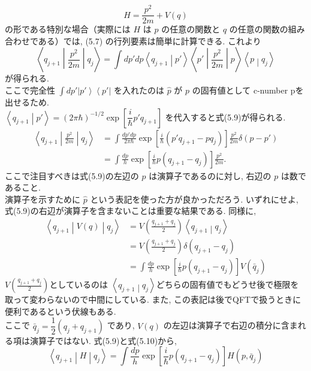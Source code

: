 \documentclass[a4paper,12pt]{article}
\newcommand{\bra}[1]{\left\langle #1\right|}
\newcommand{\ket}[1]{\left|#1\right\rangle}
\newcommand{\braket}[2]{\left\langle #1\middle|#2\right\rangle}
\newcommand{\brakets}[3]{\left\langle #1\middle| #2 \middle|#3 \right\rangle}
\begin{document}
\begin{equation*}
    H = \frac{p^2}{2m} + V(q) \tag{5.8}
\end{equation*}
の形である特別な場合（実際には $H$ は $p$ の任意の関数と $q$ の任意の関数の組み合わせである）では, (5.7) の行列要素は簡単に計算できる. これより
\begin{equation*}
    \brakets{q_{j+1}}{\frac{p^2}{2m}}{q_{j}} = \int dp' dp \braket{q_{j+1}}{p'}\brakets{p'}{\frac{p^2}{2m}}{p}\braket{p}{q_j}
\end{equation*}
が得られる.\\
\color{blue}
ここで完全性 $\displaystyle \int dp' \ket{p'}\bra{p'}$ を入れたのは $\hat{p}$ が $p$ の固有値として c-number pを出せるため.\\
\color{black}
 $\braket{q_{j+1}}{p'} = (2\pi\hbar)^{-1/2}\exp\left[ \dfrac{i}{\hbar}p'q_{j+1} \right]$ を代入すると式(5.9)が得られる.
\begin{align*}
    \brakets{q_{j+1}}{\frac{p^2}{2m}}{q_j} &= \int \frac{dp' dp}{2\pi\hbar}\exp\left[ \frac{i}{\hbar}(p' q_{j+1} - pq_{j}) \right]\frac{p^2}{2m}\delta(p - p')\\
    &= \int \frac{dp}{h}\exp\left[ \frac{i}{\hbar}p(q_{j+1} - q_{j}) \right]\frac{p^2}{2m}. \tag{5.9}
\end{align*}
ここで注目すべきは式(5.9)の左辺の $p$ は演算子であるのに対し, 右辺の $p$ は数であること. \\
演算子を示すために $\hat{p}$ という表記を使った方が良かっただろう. いずれにせよ, 式(5.9)の右辺が演算子を含まないことは重要な結果である. 同様に,
\begin{align*}
    \brakets{q_{j+1}}{V(q)}{q_j} &= V\left( \frac{q_{j+1} + q_{j}}{2} \right)\braket{q_{j+1}}{q_{j}}\\
    &= V\left( \frac{q_{j+1} + q_{j}}{2} \right)\delta(q_{j+1} - q_{j})\\
    &= \int \frac{dp}{h}\exp\left[ \frac{i}{\hbar}p(q_{j+1} - q_{j}) \right]V(\bar{q}_{j}) \tag{5.10}
\end{align*}
\color{blue}
$\displaystyle V\left( \frac{q_{j+1} + q_j}{2} \right)$としているのは $\braket{q_{j+1}}{q_j}$どちらの固有値でもどうせ後で極限を取って変わらないので中間にしている. また, この表記は後でQFTで扱うときに便利であるという伏線もある.\\
\color{black}
ここで $\bar{q}_{j} = \dfrac{1}{2}(q_{j} + q_{j+1})$ であり, $V(q)$ の左辺は演算子で右辺の積分に含まれる項は演算子ではない. 式(5.9)と式(5.10)から,
\begin{equation*}
    \brakets{q_{j+1}}{H}{q_{j}} = \int \frac{dp}{h} \exp\left[ \frac{i}{\hbar}p(q_{j+1} - q_{j}) \right] H(p, \bar{q}_{j})
\end{equation*}
\end{document}
